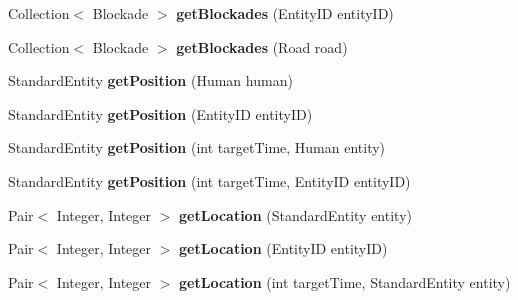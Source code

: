 \begin{DoxyCompactItemize}
Collection$<$ Blockade $>$ {\bfseries get\+Blockades} (Entity\+ID entity\+ID)
\item 
\hypertarget{classadf_1_1agent_1_1info_1_1WorldInfo_a6e96f3238adea49e1b077cb606f4f289}{}\label{classadf_1_1agent_1_1info_1_1WorldInfo_a6e96f3238adea49e1b077cb606f4f289} 
Collection$<$ Blockade $>$ {\bfseries get\+Blockades} (Road road)
\item 
\hypertarget{classadf_1_1agent_1_1info_1_1WorldInfo_ac0239ce403caf3c6135368897911ce66}{}\label{classadf_1_1agent_1_1info_1_1WorldInfo_ac0239ce403caf3c6135368897911ce66} 
Standard\+Entity {\bfseries get\+Position} (Human human)
\item 
\hypertarget{classadf_1_1agent_1_1info_1_1WorldInfo_a3c89d8ce56421194976888709d1eb068}{}\label{classadf_1_1agent_1_1info_1_1WorldInfo_a3c89d8ce56421194976888709d1eb068} 
Standard\+Entity {\bfseries get\+Position} (Entity\+ID entity\+ID)
\item 
\hypertarget{classadf_1_1agent_1_1info_1_1WorldInfo_a5b81a0933433e1100d7e85ce597e2c91}{}\label{classadf_1_1agent_1_1info_1_1WorldInfo_a5b81a0933433e1100d7e85ce597e2c91} 
Standard\+Entity {\bfseries get\+Position} (int target\+Time, Human entity)
\item 
\hypertarget{classadf_1_1agent_1_1info_1_1WorldInfo_a4b76b9409eaa7dce3a4efa07ff257c29}{}\label{classadf_1_1agent_1_1info_1_1WorldInfo_a4b76b9409eaa7dce3a4efa07ff257c29} 
Standard\+Entity {\bfseries get\+Position} (int target\+Time, Entity\+ID entity\+ID)
\item 
\hypertarget{classadf_1_1agent_1_1info_1_1WorldInfo_a4421c774a6abffa3de713efaa8ac810c}{}\label{classadf_1_1agent_1_1info_1_1WorldInfo_a4421c774a6abffa3de713efaa8ac810c} 
Pair$<$ Integer, Integer $>$ {\bfseries get\+Location} (Standard\+Entity entity)
\item 
\hypertarget{classadf_1_1agent_1_1info_1_1WorldInfo_a0a5f91d16abcb91cc8e03f645ce5e4b2}{}\label{classadf_1_1agent_1_1info_1_1WorldInfo_a0a5f91d16abcb91cc8e03f645ce5e4b2} 
Pair$<$ Integer, Integer $>$ {\bfseries get\+Location} (Entity\+ID entity\+ID)
\item 
\hypertarget{classadf_1_1agent_1_1info_1_1WorldInfo_aef0c0e11bc92958d48f58defe08e7f39}{}\label{classadf_1_1agent_1_1info_1_1WorldInfo_aef0c0e11bc92958d48f58defe08e7f39} 
Pair$<$ Integer, Integer $>$ {\bfseries get\+Location} (int target\+Time, Standard\+Entity entity)
\item 
\hypertarget{classadf_1_1agent_1_1info_1_1WorldInfo_a6aea29e8295b1e49c296b05c624595c8}{}\label{classadf_1_1agent_1_1info_1_1WorldInfo_a6aea29e8295b1e49c296b05c624595c8} 

\end{DoxyCompactItemize}
